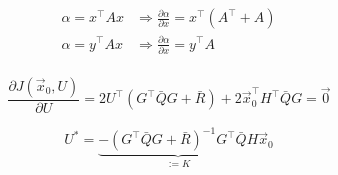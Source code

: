 \documentclass{article}
\begin{document}
\begin{align*}
\alpha = x^\top A x & \Rightarrow \frac{\partial \alpha}{\partial x} = x^\top (A^\top + A)\\
\alpha = y^\top A x & \Rightarrow \frac{\partial \alpha}{\partial x} = y^\top A\\
\end{align*}

$$
\frac{\partial J(\vec{x}_0,U)}{\partial U} = 2 U^\top(G^\top\bar{Q}G + \bar{R}) + 2 \vec{x}_0^\top H^\top \bar{Q} G = \vec{0}
$$

$$
U^* = \underbrace{-(G^\top\bar{Q}G + \bar{R})^{-1}G^\top\bar{Q}H}_{:=K}\vec{x}_0
$$
\end{document}
